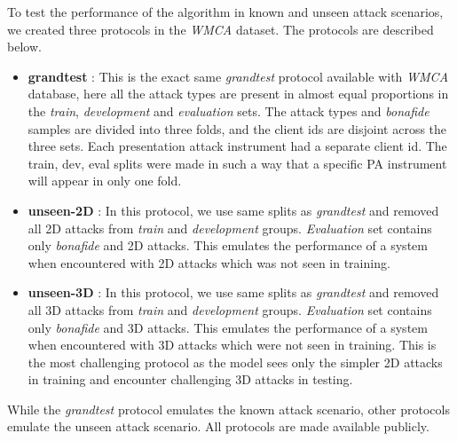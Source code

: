\documentclass[journal]{IEEEtran}
\begin{document}
To test the performance of the algorithm in known and unseen attack scenarios, we created three protocols in the \textit{WMCA} dataset. The protocols are described below.

\begin{itemize}
    \item \textbf{grandtest} : This is the exact same \textit{grandtest} protocol available with \textit{WMCA} database, here all the attack types are present in almost equal proportions in the \textit{train}, \textit{development} and \textit{evaluation} sets. The attack types and \textit{bonafide} samples are divided into three folds, and the client ids are disjoint across the three sets. Each presentation attack instrument had a separate client id. The train, dev, eval splits were made in such a way that a specific PA instrument will appear in only one fold.
    \item \textbf{unseen-2D} : In this protocol, we use same splits as \textit{grandtest} and removed all 2D attacks from \textit{train} and \textit{development} groups. \textit{Evaluation} set contains only \textit{bonafide} and 2D attacks. This emulates the performance of a system when encountered with 2D attacks which was not seen in training.
    \item \textbf{unseen-3D} : In this protocol, we use same splits as \textit{grandtest} and removed all 3D attacks from \textit{train} and \textit{development} groups. \textit{Evaluation} set contains only \textit{bonafide} and 3D attacks. This emulates the performance of a system when encountered with 3D attacks which were not seen in training. This is the most challenging protocol as the model sees only the simpler 2D attacks in training and encounter challenging 3D attacks in testing.
\end{itemize}

While the \textit{grandtest} protocol emulates the known attack scenario, other protocols emulate the unseen attack scenario. All protocols are made available publicly.
\end{document}
